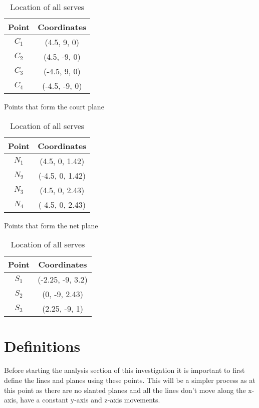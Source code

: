 \documentclass{article}
\begin{document}
\vspace{20pt}


\begin{table}[h!]
	\centering

	\begin{minipage}{0.3\textwidth}
		\centering
		\begin{tabular}{|c|c|}
			\hline
			Point & Coordinates \\
			\hline
			\(C_1\) & (4.5, 9, 0) \\
			\(C_2\) & (4.5, -9, 0) \\
			\(C_3\) & (-4.5, 9, 0) \\
			\(C_4\) & (-4.5, -9, 0) \\
			\hline
		\end{tabular}
		\caption{Points that form the court plane}
	\end{minipage}\hfill
	\begin{minipage}{0.3\textwidth}
		\centering
		\begin{tabular}{|c|c|}
			\hline
			Point & Coordinates \\
			\hline
			\(N_1\) & (4.5, 0, 1.42) \\
			\(N_2\) & (-4.5, 0, 1.42) \\
			\(N_3\) & (4.5, 0, 2.43) \\
			\(N_4\) & (-4.5, 0, 2.43) \\
			\hline
		\end{tabular}
		\caption{Points that form the net plane}
	\end{minipage}\hfill
	\begin{minipage}{0.3\textwidth}
		\centering
		\begin{tabular}{|c|c|}
			\hline
			Point & Coordinates \\
			\hline
			\(S_1\) & (-2.25, -9, 3.2) \\
			\(S_2\) & (0, -9, 2.43) \\
			\(S_3\) & (2.25, -9, 1) \\
			\hline
		\end{tabular}
		\caption{Location of all serves}
	\end{minipage}
\end{table}

\section*{Definitions}

Before starting the analysis section of this investigation it is important to first define the lines and planes using these points. This will be a simpler process as at this point as there are no slanted planes and all the lines don't move along the \(\mathrm{x}\)-axis, have a constant \(\mathrm{y}\)-axis and \(\mathrm{z}\)-axis movements.
\end{document}
